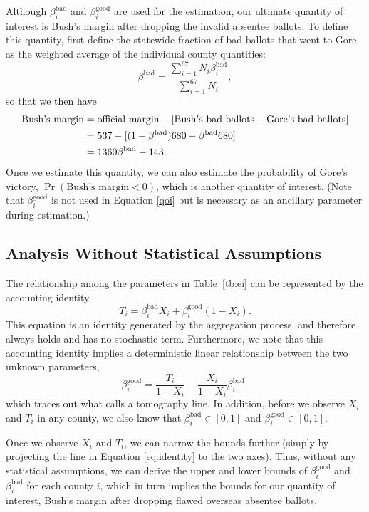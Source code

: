 \documentclass[11pt,titlepage]{article}
\newcommand{\bb}{\beta^{\text{bad}}}
\newcommand{\bg}{\beta^{\text{good}}}
\begin{document}
Although $\bb_i$ and $\bg_i$ are used for the estimation, our ultimate
quantity of interest is Bush's margin after dropping the invalid
absentee ballots.  To define this quantity, first define the statewide
fraction of bad ballots that went to Gore as the weighted average of
the individual county quantities:
\begin{equation}
  \bb=\frac{\sum_{i=1}^{67}N_i\bb_i}{\sum_{i=1}^{67}N_i},
\end{equation}
so that we then have
\begin{align}
  \text{Bush's margin} & = \text{official margin}
  - [\text{Bush's bad ballots} - \text{Gore's bad ballots}] \notag\\
  & = 537 - [(1-\bb)680-\bb 680]\notag\\
  & = 1360 \bb - 143. \label{qoi}
\end{align}
Once we estimate this quantity, we can also estimate the probability
of Gore's victory, $\Pr(\text{Bush's margin}<0)$, which is another
quantity of interest.  (Note that $\bg_i$ is not used in Equation
\ref{qoi} but is necessary as an ancillary parameter during
estimation.)

\subsection{Analysis Without Statistical Assumptions} \label{s:noassump}

The relationship among the parameters in Table~\ref{tb:ei} can be
represented by the accounting identity
\begin{equation} \label{eq:gid}
  T_i=\bb_i X_i+\bg_i (1-X_i).
\end{equation} 
This equation is an identity generated by the aggregation process, and
therefore always holds and has no stochastic term.  Furthermore, we
note that this accounting identity implies a deterministic linear
relationship between the two unknown parameters,
\begin{equation} \label{eq:identity}
\bg_i = \frac{T_i}{1-X_i}-\frac{X_i}{1-X_i}\bb_i,
\end{equation}
which traces out what \citet{king:97} calls a tomography line.  In
addition, before we observe $X_i$ and $T_i$ in any county, we also
know that $\bb_i\in[0,1]$ and $\bg_i\in[0,1]$.

Once we observe $X_i$ and $T_i$, we can narrow the bounds further
(simply by projecting the line in Equation \ref{eq:identity} to the
two axes).  Thus, without any statistical assumptions, we can derive
the upper and lower bounds of $\bg_i$ and $\bb_i$ for each county $i$,
which in turn implies the bounds for our quantity of interest, Bush's
margin after dropping flawed overseas absentee ballots.
\end{document}
